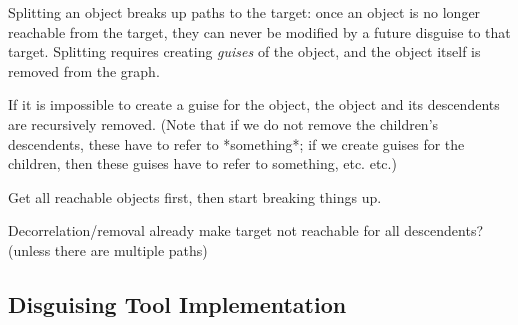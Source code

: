 Splitting an object breaks up paths to the target: once an object is no longer reachable from the
target, they can never be modified by a future disguise to that target.  Splitting requires creating
\emph{guises} of the object, and the object itself is removed from the graph.

If it is impossible to create a guise for the object, the object and its descendents are recursively
removed. (Note that if we do not remove the children's descendents, these have to refer to
*something*; if we create guises for the children, then these guises have to refer to something, etc. etc.)

Get all reachable objects first, then start breaking things up.

Decorrelation/removal already make target not reachable for all descendents? (unless there are
multiple paths)

\subsection{Disguising Tool Implementation}


